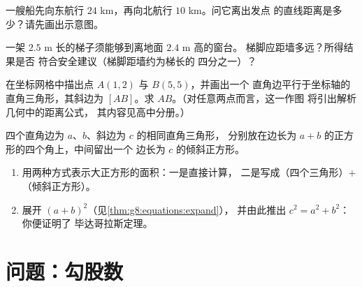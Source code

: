 \begin{exercise}[$\star\star$]\label{exo:g8:pythagoras:8}
一艘船先向东航行 $24$ km，再向北航行 $10$ km。问它离出发点
的直线距离是多少？请先画出示意图。
\end{exercise}

\begin{exercise}[$\star\star$]\label{exo:g8:pythagoras:9}
一架 $2.5$ m 长的梯子须能够到离地面 $2.4$ m 高的窗台。
梯脚应距墙多远？所得结果是否
符合安全建议（梯脚距墙约为梯长的
四分之一）？
\end{exercise}

\begin{exercise}[$\star\star$]\label{exo:g8:pythagoras:10}
在坐标网格中描出点 $A(1, 2)$ 与 $B(5, 5)$，并画出一个
直角边平行于坐标轴的直角三角形，其斜边为
$[AB]$。求 $AB$。（对任意两点而言，这一作图
将引出解析几何中的距离公式，
其内容见高中分册。）
\end{exercise}

\begin{exercise}[$\star\star\star$]\label{exo:g8:pythagoras:11}
四个直角边为 $a$、$b$、斜边为 $c$ 的相同直角三角形，
分别放在边长为 $a + b$ 的正方形的四个角上，中间留出一个
边长为 $c$ 的倾斜正方形。
\begin{enumerate}
  \item 用两种方式表示大正方形的面积：一是直接计算，
        二是写成（四个三角形）$+$（倾斜正方形）。
  \item 展开 $(a + b)^2$（见\cref{thm:g8:equations:expand}），
        并由此推出 $c^2 = a^2 + b^2$：你便证明了
        毕达哥拉斯定理。
\end{enumerate}
\end{exercise}

\section{问题：勾股数}

